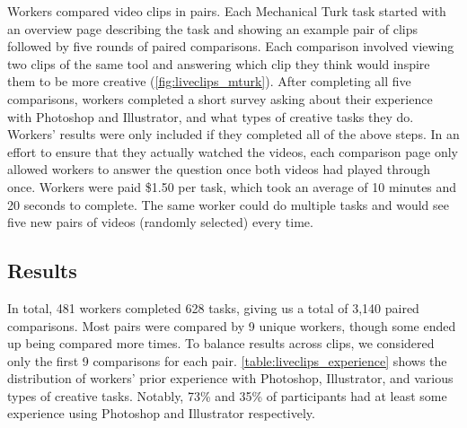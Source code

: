 Workers compared video clips in pairs. Each Mechanical Turk task started with an overview page describing the task and showing an example pair of clips followed by five rounds of paired comparisons. Each comparison involved viewing two clips of the same tool and answering which clip they think would inspire them to be more creative (\autoref{fig:liveclips_mturk}). After completing all five comparisons, workers completed a short survey asking about their experience with Photoshop and Illustrator, and what types of creative tasks they do. Workers' results were only included if they completed all of the above steps. In an effort to ensure that they actually watched the videos, each comparison page only allowed workers to answer the question once both videos had played through once. Workers were paid \$1.50 per task, which took an average of 10 minutes and 20 seconds to complete. The same worker could do multiple tasks and would see five new pairs of videos (randomly selected) every time.

\subsection{Results}
In total, 481 workers completed 628 tasks, giving us a total of 3,140 paired comparisons. Most pairs were compared by 9 unique workers, though some ended up being compared more times. To balance results across clips, we considered only the first 9 comparisons for each pair. \autoref{table:liveclips_experience} shows the distribution of workers' prior experience with Photoshop, Illustrator, and various types of creative tasks. Notably, 73\% and 35\% of participants had at least some experience using Photoshop and Illustrator respectively.

